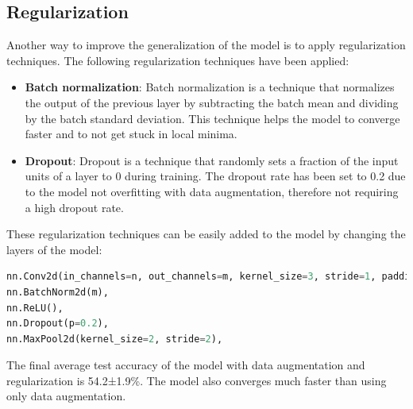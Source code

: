 \documentclass[a4paper, 11pt]{article}
\begin{document}
\subsection{Regularization}
Another way to improve the generalization of the model is to apply regularization techniques.
The following regularization techniques have been applied:
\begin{itemize}
    \item \textbf{Batch normalization}: Batch normalization is a technique that normalizes the output of the previous layer by subtracting the batch mean and dividing by the batch standard deviation. 
    This technique helps the model to converge faster and to not get stuck in local minima. \cite{ioffe2015batch}
    \item \textbf{Dropout}: Dropout is a technique that randomly sets a fraction of the input units of a layer to 0 during training.
    The dropout rate has been set to 0.2 due to the model not overfitting with data augmentation, therefore not requiring a high dropout rate.
\end{itemize}
These regularization techniques can be easily added to the model by changing the layers of the model:
\begin{lstlisting}[language=Python]
nn.Conv2d(in_channels=n, out_channels=m, kernel_size=3, stride=1, padding=1),
nn.BatchNorm2d(m),
nn.ReLU(),
nn.Dropout(p=0.2),
nn.MaxPool2d(kernel_size=2, stride=2),
\end{lstlisting}
The final average test accuracy of the model with data augmentation and regularization is 54.2±1.9\%.
The model also converges much faster than using only data augmentation.
\end{document}
